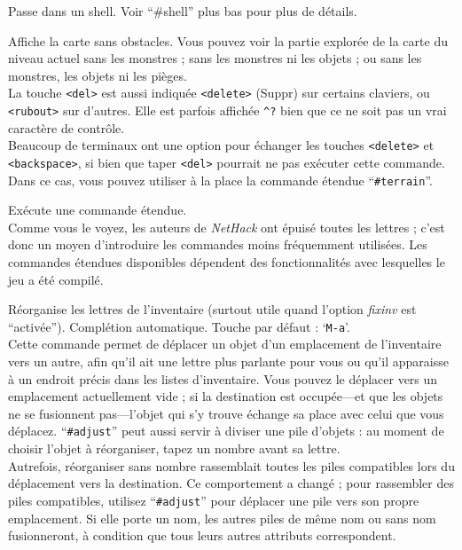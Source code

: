 \documentclass[titlepage]{article}
\begin{document}
\begin{description}[font=\mdseries\ttfamily]
\item[!]
Passe dans un shell.
Voir ``\#shell'' plus bas pour plus de détails.
\item[Del]
Affiche la carte sans obstacles.
Vous pouvez voir la partie explorée de la carte du niveau actuel sans
les monstres ; sans les monstres ni les objets ; ou sans les monstres, les objets
ni les pièges.\\
La touche \texttt{<del>} est aussi indiquée \texttt{<delete>} (Suppr) sur certains claviers, ou
\texttt{<rubout>} sur d'autres.
Elle est parfois affichée \texttt{\textasciicircum ?} bien que ce ne soit pas un vrai
caractère de contrôle.\\
Beaucoup de terminaux ont une option pour échanger les touches \texttt{<delete>} et \texttt{<backspace>},
si bien que taper \texttt{<del>} pourrait ne pas exécuter cette commande.
Dans ce cas, vous pouvez utiliser à la place la commande étendue ``\texttt{\#terrain}''.
\item[\#]
Exécute une commande étendue.\\
Comme vous le voyez, les auteurs de \textit{NetHack}
ont épuisé toutes les lettres ; c'est donc un moyen d'introduire les commandes
moins fréquemment utilisées.
Les commandes étendues disponibles dépendent des fonctionnalités avec lesquelles
le jeu a été compilé.
\item[\#adjust]
Réorganise les lettres de l'inventaire (surtout utile quand l'option
\textit{fixinv}
est ``activée''). Complétion automatique. Touche par défaut : `\texttt{M-a}'.\\
Cette commande permet de déplacer un objet d'un emplacement de l'inventaire
vers un autre, afin qu'il ait une lettre plus parlante pour vous
ou qu'il apparaisse à un endroit précis dans les listes
d'inventaire.
Vous pouvez le déplacer vers un emplacement actuellement vide ; si la destination est
occupée---et que les objets ne se fusionnent pas---l'objet
qui s'y trouve échange sa place avec celui que vous déplacez.
``\texttt{\#adjust}'' peut aussi servir à diviser une pile d'objets : au moment
de choisir l'objet à réorganiser, tapez un nombre avant sa lettre.\\
Autrefois, réorganiser sans nombre rassemblait toutes les piles compatibles lors
du déplacement vers la destination.  Ce comportement a changé ; pour rassembler
des piles compatibles, utilisez ``\texttt{\#adjust}'' pour déplacer une pile vers son propre emplacement.
Si elle porte un nom, les autres piles de même nom ou sans
nom fusionneront, à condition que tous leurs autres attributs correspondent.

\end{description}
\end{document}

